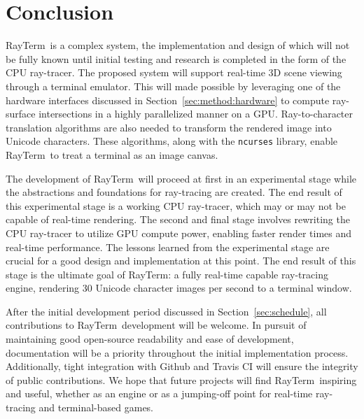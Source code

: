 \documentclass[11pt]{article}
\newcommand{\name}{{\sc RayTerm}}
\begin{document}
\section{Conclusion}
\label{sec:conclusion}


\name\ is a complex system, the implementation and design of which will not be fully known until initial testing and research is completed in the form of the CPU ray-tracer.
The proposed system will support real-time 3D scene viewing through a terminal emulator.
This will made possible by leveraging one of the hardware interfaces discussed in Section~\ref{sec:method:hardware} to compute ray-surface intersections in a highly parallelized manner on a GPU.
Ray-to-character translation algorithms are also needed to transform the rendered image into Unicode characters.
These algorithms, along with the \texttt{ncurses} library, enable \name\ to treat a terminal as an image canvas.

The development of \name\ will proceed at first in an experimental stage while the abstractions and foundations for ray-tracing are created.
The end result of this experimental stage is a working CPU ray-tracer, which may or may not be capable of real-time rendering.
The second and final stage involves rewriting the CPU ray-tracer to utilize GPU compute power, enabling faster render times and real-time performance.
The lessons learned from the experimental stage are crucial for a good design and implementation at this point.
The end result of this stage is the ultimate goal of \name: a fully real-time capable ray-tracing engine, rendering 30 Unicode character images per second to a terminal window.

After the initial development period discussed in Section~\ref{sec:schedule}, all contributions to \name\ development will be welcome.
In pursuit of maintaining good open-source readability and ease of development, documentation will be a priority throughout the initial implementation process.
Additionally, tight integration with Github and Travis CI will ensure the integrity of public contributions.
We hope that future projects will find \name\ inspiring and useful, whether as an engine or as a jumping-off point for real-time ray-tracing and terminal-based games.

\pagebreak



\end{document}
